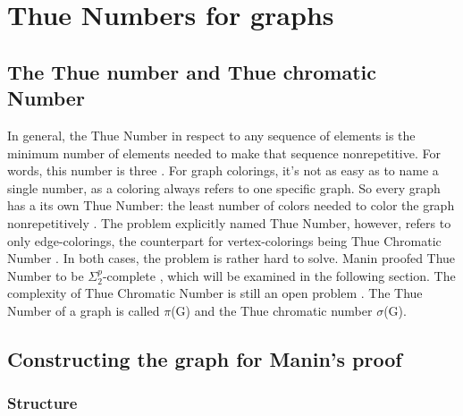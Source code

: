 \documentclass[12pt,a4paper]{article}
\begin{document}
\newpage

\section{Thue Numbers for graphs}
\subsection{The Thue number and Thue chromatic Number}

In general, the Thue Number in respect to any sequence of elements is the minimum number of elements needed to make that sequence nonrepetitive. For words, this number is three \citep{Thue1906}. For graph colorings, it's not as easy as to name a single number, as a coloring always refers to one specific graph. So every graph has a its own Thue Number: the least number of colors needed to color the graph nonrepetitively \citep{Alon2002}. The problem explicitly named Thue Number, however, refers to only edge-colorings, the counterpart for vertex-colorings being Thue Chromatic Number \citep{Schaefer2002}. In both cases, the problem is rather hard to solve. Manin proofed Thue Number to be $\Sigma^p_2$-complete \citep{Manin2008}, which will be examined in the following section. The complexity of Thue Chromatic Number is still an open problem \citep{Schaefer2002}. The Thue Number of a graph is called $\pi$(G) and the Thue chromatic number $\sigma$(G).

\subsection{Constructing the graph for Manin's proof}
\subsubsection{Structure}
\end{document}
